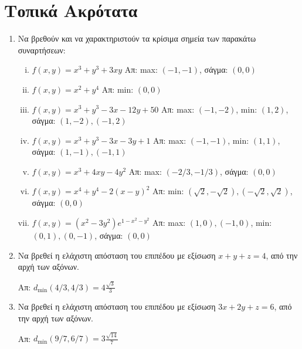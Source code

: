 \documentclass[a4paper,table]{report}
\begin{document}
\begin{center}
  \minibox{\large \bfseries \textcolor{Col1}{Ασκήσεις στα Ακρότατα}}
\end{center}

\vspace{\baselineskip}

\section*{Τοπικά Ακρότατα}

\begin{enumerate}
  \item Να βρεθούν και να χαρακτηριστούν τα κρίσιμα σημεία  των παρακάτω συναρτήσεων:
    \begin{enumerate}[i)]
      \item $ f(x,y) = x^{3} + y^{3} + 3xy $ 
        \hfill Απ: max: $(-1,-1)  $, σάγμα: $ (0,0) $
      \item $ f(x,y) = x^{2}+y^{4} $ 
        \hfill Απ: min: $ (0,0) $ 
      \item $ f(x,y) = x^{3} + y^{3} - 3x -12y + 50 $ 
        \hfill Απ: max: $ (-1,-2)$, min: $ (1,2) $, 
        σάγμα: $ (1,-2), (-1,2) $
      \item $ f(x,y) = x^{3} + y^{3} -3x -3y + 1 $ 
        \hfill Απ: max: $(-1,-1)  $, min: $ (1,1) $,
        σάγμα: $ (1,-1), (-1,1) $
      \item $ f(x,y) = x^{3} + 4xy -4y^{2} $ 
        \hfill Απ: max: $ (-2/3, -1/3)  $, σάγμα: $ (0,0) $
      \item $ f(x,y) = x^{4} + y^{4} -2(x-y)^{2}$  
        \hfill Απ: min: $ (\sqrt{2} , -\sqrt{2}), (-\sqrt{2} , \sqrt{2}) $, 
        σάγμα: $ (0,0) $
      \item $ f(x,y) = (x^{2}-3y^{2})e^{1-x^{2}-y^{2}} $ 
        \hfill Απ: max: $ (1,0), (-1,0) $, min: $ (0,1), (0,-1) $, 
        σάγμα: $ (0,0) $
    \end{enumerate}

  \item Να βρεθεί η ελάχιστη απόσταση του επιπέδου με εξίσωση $ x+y+z=4 $, από την 
    αρχή των αξόνων.

    \hfill Απ: $ d_{\min}(4/3,4/3) = 4\frac{\sqrt{3}}{3} $  

  \item Να βρεθεί η ελάχιστη απόσταση του επιπέδου με εξίσωση $ 3x+2y+z=6 $, από την 
    αρχή των αξόνων.

    \hfill Απ: $ d_{\min}(9/7,6/7) = 3\frac{\sqrt{14}}{7} $  


\end{enumerate}
\end{document}
